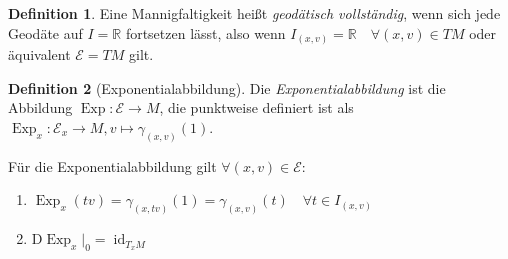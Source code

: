 \documentclass[a4paper]{scrbook}
\numberwithin{equation}{chapter}
\newcommand{\DD}{\mathrm{D}}
\DeclareMathOperator{\id}{id}
\DeclareMathOperator{\Exp}{Exp}
\newcommand{\R}{\mathbb{R}}
\theoremstyle{definition}
\newtheorem{defn}{Definition}[section]
\begin{document}
		\begin{defn}
			Eine Mannigfaltigkeit heißt \emph{geodätisch vollständig}, wenn sich jede Geodäte auf $I=\R$ fortsetzen lässt, also wenn $I_{(x,v)}=\R\quad\forall (x,v)\in TM$ oder äquivalent $\mathcal{E}=TM$ gilt.
		\end{defn}
		\begin{defn}[Exponentialabbildung]
			Die \emph{Exponentialabbildung} ist die Abbildung $\Exp\colon \mathcal{E}\rightarrow M$, die punktweise definiert ist als $\Exp_x\colon \mathcal{E}_x\rightarrow M, v\mapsto \gamma_{(x,v)}(1)$.
			
			Für die Exponentialabbildung gilt $\forall(x,v)\in \mathcal{E}$:
			\begin{enumerate}[label=(\roman*)]
				\item $\Exp_x(tv)=\gamma_{(x,tv)}(1)=\gamma_{(x,v)}(t) \quad\forall t\in I_{(x,v)}$
				\item $\DD\Exp_x\vert_0=\id_{T_xM}$
			\end{enumerate}
		\end{defn}


\appendix
{} %
\end{document}
